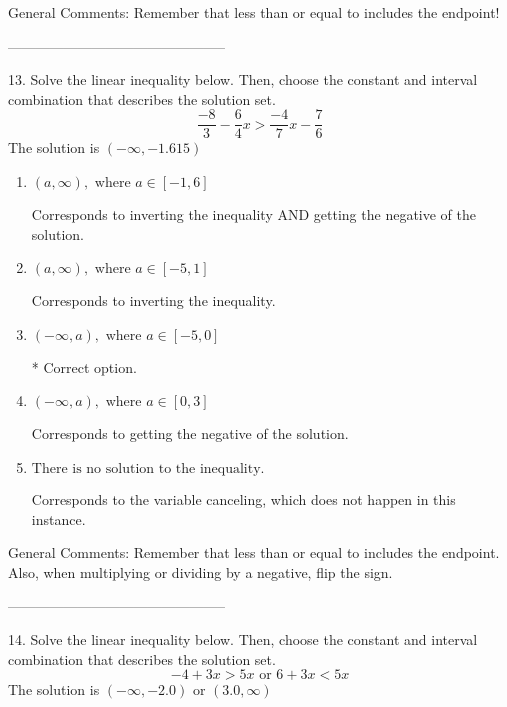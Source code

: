 \documentclass{article}[10pt]
\begin{document}
General Comments: Remember that less than or equal to includes the endpoint!

-----------------------------------------------

13. Solve the linear inequality below. Then, choose the constant and interval combination that describes the solution set.
$$ \frac{-8}{3} - \frac{6}{4} x > \frac{-4}{7} x - \frac{7}{6} $$ 
The solution is $ (-\infty, -1.615) $ 

\begin{enumerate}[label=\Alph*.] 
\item $ (a, \infty), \text{ where } a \in [-1, 6] $ 

 Corresponds to inverting the inequality AND getting the negative of the solution. 
\item $ (a, \infty), \text{ where } a \in [-5, 1] $ 

 Corresponds to inverting the inequality. 
\item $ (-\infty, a), \text{ where } a \in [-5, 0] $ 

  * Correct option. 
\item $ (-\infty, a), \text{ where } a \in [0, 3] $ 

 Corresponds to getting the negative of the solution. 
\item $ \text{There is no solution to the inequality.} $ 

 Corresponds to the variable canceling, which does not happen in this instance. 
\end{enumerate} 
 
General Comments: Remember that less than or equal to includes the endpoint. Also, when multiplying or dividing by a negative, flip the sign.

-----------------------------------------------

14. Solve the linear inequality below. Then, choose the constant and interval combination that describes the solution set.
$$ -4 + 3 x > 5 x \text{ or } 6 + 3 x < 5 x $$ 
The solution is $ (-\infty, -2.0) \text{ or } (3.0, \infty) $ 
\end{document}
